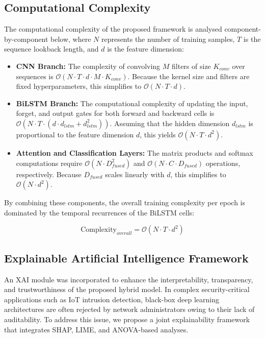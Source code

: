 \documentclass[a4paper,fleqn]{cas-sc}
\begin{document}
\subsection{Computational Complexity}

The computational complexity of the proposed framework is analysed component-by-component below, where $N$ represents the number of training samples, $T$ is the sequence lookback length, and $d$ is the feature dimension:
\begin{itemize}
    \item \textbf{CNN Branch:} The complexity of convolving $M$ filters of size $K_{conv}$ over sequences is $\mathcal{O}(N \cdot T \cdot d \cdot M \cdot K_{conv})$. Because the kernel size and filters are fixed hyperparameters, this simplifies to $\mathcal{O}(N \cdot T \cdot d)$.
    \item \textbf{BiLSTM Branch:} The computational complexity of updating the input, forget, and output gates for both forward and backward cells is $\mathcal{O}(N \cdot T \cdot (d \cdot d_{lstm} + d_{lstm}^2))$. Assuming that the hidden dimension $d_{lstm}$ is proportional to the feature dimension $d$, this yields $\mathcal{O}(N \cdot T \cdot d^2)$.
    \item \textbf{Attention and Classification Layers:} The matrix products and softmax computations require $\mathcal{O}(N \cdot D_{fused}^2)$ and $\mathcal{O}(N \cdot C \cdot D_{fused})$ operations, respectively. Because $D_{fused}$ scales linearly with $d$, this simplifies to $\mathcal{O}(N \cdot d^2)$.
\end{itemize}

By combining these components, the overall training complexity per epoch is dominated by the temporal recurrences of the BiLSTM cells:

\begin{equation}
\text{Complexity}_{overall} = \mathcal{O}(N \cdot T \cdot d^2)
\end{equation}

\subsection{Explainable Artificial Intelligence Framework}

An XAI module was incorporated to enhance the interpretability, transparency, and trustworthiness of the proposed hybrid model. In complex security-critical applications such as IoT intrusion detection, black-box deep learning architectures are often rejected by network administrators owing to their lack of auditability. To address this issue, we propose a joint explainability framework that integrates SHAP, LIME, and ANOVA-based analyses. 
\end{document}

